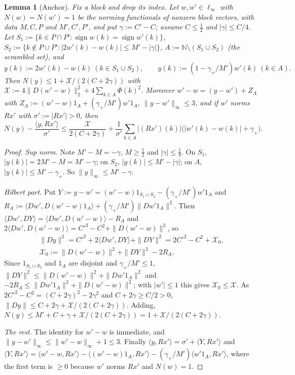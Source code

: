 \documentclass[10pt]{amsart}
\newtheorem{lemma}[theorem]{Lemma}
\theoremstyle{definition}
\theoremstyle{remark}
\newcommand{\sgn}{\operatorname{sign}}
\newcommand{\N}{\mathbb N}
\newcommand{\ip}[2]{\langle #1,#2\rangle}
\begin{document}
\begin{lemma}[Anchor]\label{lem:anchor}
Fix a block and drop its index.  Let $w,w'\in\ell_\infty$ with
$N(w)=N(w')=1$ be the norming functionals of nonzero block vectors, with
data $M,C,P$ and $M',C',P'$, and put $\gamma:=C'-C$; assume $C\le\frac12$
and $|\gamma|\le C/4$.  Let $S_1:=\{k\in P\cap P':\sgn w(k)=\sgn w'(k)\}$,
$S_2:=\{k\notin P\cup P':|2w'(k)-w(k)|\le M'-|\gamma|\}$,
$A:=\N\setminus(S_1\cup S_2)$ \textup{(}the \emph{scrambled set}\textup{)},
and
\[
 y(k):=2w'(k)-w(k)\ (k\in S_1\cup S_2),\qquad
 y(k):=(1-\gamma_+/M')w'(k)\ (k\in A).
\]
Then $N(y)\le1+\mathcal X/(2(C+2\gamma))$ with
$\mathcal X:=4\|D(w'-w)\|_2^2+4\sum_{k\in A}\Phi(k)^2$.  Moreover
$w'-w=(y-w')+Z_A$ with $Z_A:=(w'-w)1_A+(\gamma_+/M')w'1_A$,
$\|y-w'\|_\infty\le3$, and if $w'$ norms $R x'$ with $\sigma':=|Rx'|>0$,
then
\[
 N(y)-\frac{\ip{y}{Rx'}}{\sigma'}\le\frac{\mathcal X}{2(C+2\gamma)}+
 \frac1{\sigma'}\sum_{k\in A}|(Rx')(k)|\big(|w'(k)-w(k)|+\gamma_+\big).
\]
\end{lemma}

\begin{proof}
\emph{Sup norm.}  Note $M'-M=-\gamma$, $M\ge\frac12$ and $|\gamma|\le\frac18$.
On $S_1$, $|y(k)|=2M'-M=M'-\gamma$; on $S_2$, $|y(k)|\le M'-|\gamma|$; on
$A$, $|y(k)|\le M'-\gamma_+$.  So $\|y\|_\infty\le M'-\gamma$.

\emph{Hilbert part.}  Put $Y:=y-w'=(w'-w)1_{S_1\cup S_2}-(\gamma_+/M')w'1_A$
and $R_A:=\ip{Dw'}{D(w'-w)1_A}+(\gamma_+/M')\|Dw'1_A\|^2$.  Then
$\ip{Dw'}{DY}=\ip{Dw'}{D(w'-w)}-R_A$ and $2\ip{Dw'}{D(w'-w)}=C'^2-C^2+
\|D(w'-w)\|^2$, so
\begin{gather*}
 \|Dy\|^2=C'^2+2\ip{Dw'}{DY}+\|DY\|^2=2C'^2-C^2+\mathcal X_0,\\
 \mathcal X_0:=\|D(w'-w)\|^2+\|DY\|^2-2R_A .
\end{gather*}
Since $1_{S_1\cup S_2}$ and $1_A$ are disjoint and $\gamma_+/M'\le1$,
$\|DY\|^2\le\|D(w'-w)\|^2+\|Dw'1_A\|^2$ and $-2R_A\le\|Dw'1_A\|^2+
\|D(w'-w)\|^2$; with $|w'|\le1$ this gives $\mathcal X_0\le\mathcal X$.  As
$2C'^2-C^2=(C+2\gamma)^2-2\gamma^2$ and $C+2\gamma\ge C/2>0$,
$\|Dy\|\le C+2\gamma+\mathcal X/(2(C+2\gamma))$.  Adding,
$N(y)\le M'+C+\gamma+\mathcal X/(2(C+2\gamma))=1+\mathcal X/(2(C+2\gamma))$.

\emph{The rest.}  The identity for $w'-w$ is immediate, and
$\|y-w'\|_\infty\le\|w'-w\|_\infty+1\le3$.  Finally $\ip{y}{Rx'}=\sigma'+
\ip{Y}{Rx'}$ and $\ip{Y}{Rx'}=\ip{w'-w}{Rx'}-\ip{(w'-w)1_A}{Rx'}-
(\gamma_+/M')\ip{w'1_A}{Rx'}$, where the first term is $\ge0$ because $w'$
norms $Rx'$ and $N(w)=1$.
\end{proof}
\end{document}
